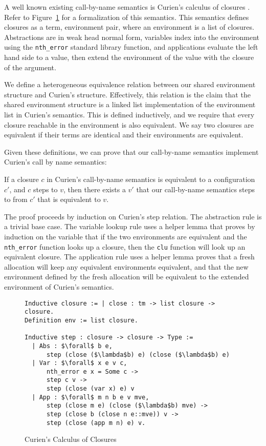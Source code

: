 A well known existing call-by-name semantics is Curien's calculus of closures
\cite{curien1991abstract}. Refer to Figure~\ref{fig:curien} for a formalization of this
semantics. This semantics defines closures as a term, environment pair, where an
environment is a list of closures. Abstractions are in weak head normal form,
variables index into the environment using the \texttt{nth\_error} standard
library function, and applications evaluate the left hand side to a value, then
extend the environment of the value with the closure of the argument. 

We define a heterogeneous equivalence relation between our shared environment
structure and Curien's structure. Effectively, this relation is the claim that
the shared environment structure is a linked list implementation of the
environment list in Curien's semantics. This is defined inductively, and we
require that every closure reachable in the environment is also equivalent.  We
say two closures are equivalent if their terms are identical and their
environments are equivalent. 

Given these definitions, we can prove that our call-by-name semantics implement
Curien's call by name semantics: 

\begin{theorem}
If a closure $c$ in Curien's call-by-name semantics is equivalent to a
configuration $c'$, and $c$ steps to $v$, then there exists a $v'$ that our
call-by-name semantics steps to from $c'$ that is equivalent to $v$.
\end{theorem}
\begin{proofoutline}
The proof proceeds by induction on Curien's step relation. The abstraction rule
is a trivial base case. The variable lookup rule uses a helper lemma that proves
by induction on the variable that if the two environments are equivalent and the
\texttt{nth\_error} function looks up a closure, then the \texttt{clu} function
will look up an equivalent closure. The application rule uses a helper lemma
proves that a fresh allocation will keep any equivalent environments equivalent,
and that the new environment defined by the fresh allocation will be equivalent
to the extended environment of Curien's semantics.
\end{proofoutline}

\begin{figure}
\begin{lstlisting}
Inductive closure := | close : tm -> list closure -> closure. 
Definition env := list closure.

Inductive step : closure -> closure -> Type := 
  | Abs : $\forall$ b e, 
      step (close ($\lambda$b) e) (close ($\lambda$b) e)
  | Var : $\forall$ x e v c, 
      nth_error e x = Some c -> 
      step c v -> 
      step (close (var x) e) v
  | App : $\forall$ m n b e v mve,
      step (close m e) (close ($\lambda$b) mve) ->
      step (close b (close n e::mve)) v ->
      step (close (app m n) e) v.
\end{lstlisting}
\caption{Curien's Calculus of Closures}
\label{fig:curien}
\end{figure}


